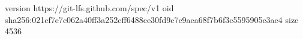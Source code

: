 version https://git-lfs.github.com/spec/v1
oid sha256:021cf7e7c062a40ff3a252cff6488ce30fd9c7c9aea68f7b6f3c5595905c3ae4
size 4536
